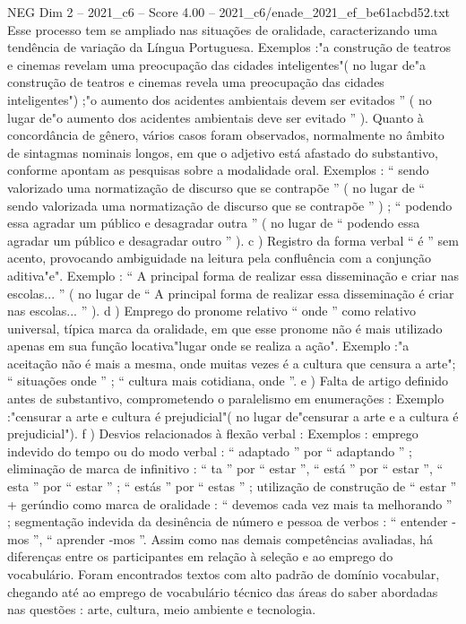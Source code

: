 \begin{textsample}{NEG Dim 2 – 2021\_c6 – Score 4.00 – 2021\_c6/enade\_2021\_ef\_be61acbd52.txt}
Esse processo tem se ampliado nas situações de oralidade, caracterizando uma tendência de variação da Língua Portuguesa.
Exemplos :"a construção de teatros e cinemas revelam uma preocupação das cidades inteligentes"( no lugar de"a construção de teatros e cinemas revela uma preocupação das cidades inteligentes") ;"o aumento dos acidentes ambientais devem ser evitados ” ( no lugar de"o aumento dos acidentes ambientais deve ser evitado ” ).
Quanto à concordância de gênero, vários casos foram observados, normalmente no âmbito de sintagmas nominais longos, em que o adjetivo está afastado do substantivo, conforme apontam as pesquisas sobre a modalidade oral.
Exemplos : “ sendo valorizado uma normatização de discurso que se contrapõe ” ( no lugar de “ sendo valorizada uma normatização de discurso que se contrapõe ” ) ; “ podendo essa agradar um público e desagradar outra ” ( no lugar de “ podendo essa agradar um público e desagradar outro ” ). c ) Registro da forma verbal “ é ” sem acento, provocando ambiguidade na leitura pela confluência com a conjunção aditiva"e".
Exemplo : “ A principal forma de realizar essa disseminação e criar nas escolas... ” ( no lugar de “ A principal forma de realizar essa disseminação é criar nas escolas... ” ). d ) Emprego do pronome relativo “ onde ” como relativo universal, típica marca da oralidade, em que esse pronome não é mais utilizado apenas em sua função locativa"lugar onde se realiza a ação".
Exemplo :"a aceitação não é mais a mesma, onde muitas vezes é a cultura que censura a arte"; “ situações onde ” ; “ cultura mais cotidiana, onde ”. e ) Falta de artigo definido antes de substantivo, comprometendo o paralelismo em enumerações : Exemplo :"censurar a arte e cultura é prejudicial"( no lugar de"censurar a arte e a cultura é prejudicial"). f ) Desvios relacionados à flexão verbal : Exemplos : emprego indevido do tempo ou do modo verbal : “ adaptado ” por “ adaptando ” ; eliminação de marca de infinitivo : “ ta ” por “ estar ”, “ está ” por “ estar ”, “ esta ” por “ estar ” ; “ estás ” por “ estas ” ; utilização de construção de “ estar ” + gerúndio como marca de oralidade : “ devemos cada vez mais ta melhorando ” ; segmentação indevida da desinência de número e pessoa de verbos : “ entender -mos ”, “ aprender -mos ”.
Assim como nas demais competências avaliadas, há diferenças entre os participantes em relação à seleção e ao emprego do vocabulário.
Foram encontrados textos com alto padrão de domínio vocabular, chegando até ao emprego de vocabulário técnico das áreas do saber abordadas nas questões : arte, cultura, meio ambiente e tecnologia.

\end{textsample}
